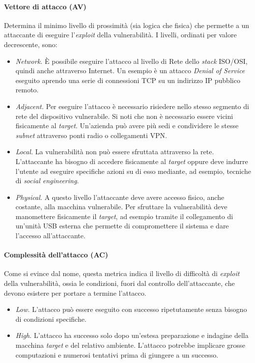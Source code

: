 \documentclass[target=bach,aauheader=]{thud}
\begin{document}
\paragraph{Vettore di attacco (AV)} Determina il minimo livello di prossimità (sia logica che fisica) che permette a un attaccante di eseguire l'\textit{exploit} della vulnerabilità. I livelli, ordinati per valore decrescente, sono:

    \begin{itemize}
        \item \textit{Network.} È possibile eseguire l'attacco al livello di Rete dello \textit{stack} ISO/OSI, quindi anche attraverso Internet. Un esempio è un attacco \textit{Denial of Service} eseguito aprendo una serie di connessioni TCP su un indirizzo IP pubblico remoto.
        \item \textit{Adjacent.} Per eseguire l'attacco è necessario risiedere nello stesso segmento di rete del dispositivo vulnerabile. Si noti che non è necessario essere vicini fisicamente al \textit{target}. Un'azienda può avere più sedi e condividere le stesse \textit{subnet} attraverso ponti radio o collegamenti VPN.
        \item \textit{Local.} La vulnerabilità non può essere sfruttata attraverso la rete. L'attaccante ha bisogno di accedere fisicamente al \textit{target} oppure deve indurre l'utente ad eseguire specifiche azioni su di esso mediante, ad esempio, tecniche di \textit{social engineering}.
        \item \textit{Physical.} A questo livello l'attaccante deve avere accesso fisico, anche costante, alla macchina vulnerabile. Per sfruttare la vulnerabilità deve manomettere fisicamente il \textit{target}, ad esempio tramite il collegamento di un'unità USB esterna che permette di compromettere il sistema e dare l'accesso all'attaccante.
    \end{itemize}

\paragraph{Complessità dell'attacco (AC)} Come si evince dal nome, questa metrica indica il livello di difficoltà di \textit{exploit} della vulnerabilità, ossia le condizioni, fuori dal controllo dell'attaccante, che devono esistere per portare a termine l'attacco.

    \begin{itemize}
        \item \textit{Low.} L'attacco può essere eseguito con successo ripetutamente senza bisogno di condizioni specifiche.
        \item \textit{High.} L'attacco ha successo solo dopo un'estesa preparazione e indagine della macchina \textit{target} e del relativo ambiente. L'attacco potrebbe implicare grosse computazioni e numerosi tentativi prima di giungere a un successo.
    \end{itemize}
\end{document}
